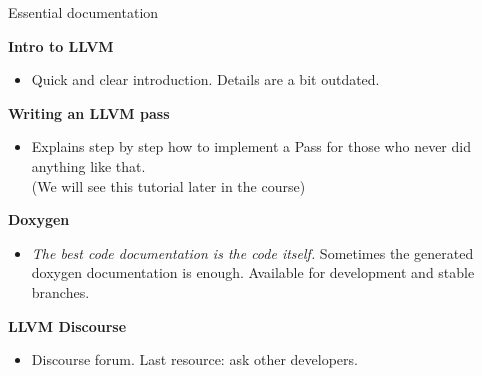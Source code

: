 \begin{frame}[t]{Essential documentation}
\vfill
\raggedright
\textbf{Intro to LLVM}~\cite{LOCAL:www/llvmIntro}\\
\begin{itemize}
\item Quick and clear introduction. Details are a bit outdated.
\end{itemize}
\textbf{Writing an LLVM pass}~\cite{LOCAL:www/llvmWritingAPass}\\
\begin{itemize}
\item Explains step by step how to implement a Pass
      for those who never did anything like that.\\
      {\footnotesize (We will see this tutorial later in the course)}
\end{itemize}
\textbf{Doxygen}~\cite{LOCAL:www/llvmDoxygen}\\
\begin{itemize}
\item \textit{The best code documentation is the code itself.}
       Sometimes the generated doxygen documentation is enough.
       Available for development and stable branches.
\end{itemize}
\textbf{LLVM Discourse}~\cite{LOCAL:www/llvmDiscourse}\\
\begin{itemize}
\item Discourse forum. Last resource: ask other developers.
\end{itemize}
\vfill
\end{frame}

